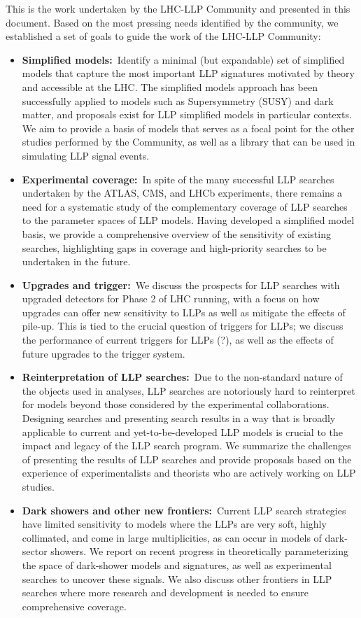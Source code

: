 This is the work undertaken by the LHC-LLP Community and presented in this document. Based on the most pressing needs identified by the community, we established a set of goals to guide the work of the LHC-LLP Community:
%
\begin{itemize}

\item {\bf Simplified models:}~Identify a minimal (but expandable) set of simplified models that capture the most important LLP signatures motivated by theory and accessible at the LHC. The simplified models approach has been successfully applied to models such as Supersymmetry (SUSY) and dark matter, and proposals exist for LLP simplified models in particular contexts. We aim to provide a basis of models that serves as a focal point for the other studies performed by the Community, as well as a library that can be used in simulating LLP signal events.

\item {\bf Experimental coverage:}~In spite of the many successful LLP searches undertaken by the ATLAS, CMS, and LHCb experiments, there remains a need for a systematic study of the complementary coverage of LLP searches to the parameter spaces of LLP models. Having developed a simplified model basis, we provide a comprehensive overview of the sensitivity of existing searches, highlighting gaps in coverage and high-priority searches to be undertaken in the future.

\item {\bf Upgrades and trigger:}~We discuss the prospects for LLP searches with upgraded detectors for Phase 2 of LHC running, with a focus on how upgrades can offer new sensitivity to LLPs as well as mitigate the effects of pile-up. This is tied to the crucial question of triggers for LLPs; we discuss the performance of current triggers for LLPs (?), as well as the effects of future upgrades to the trigger system.

\item {\bf Reinterpretation of LLP searches:}~Due to the non-standard nature of the objects used in analyses, LLP searches are notoriously hard to reinterpret for models beyond those considered by the experimental collaborations. Designing searches and presenting search results in a way that is broadly applicable to current and yet-to-be-developed LLP models is crucial to the impact and legacy of the LLP search program. We summarize the challenges of presenting the results of LLP searches and provide proposals based on the experience of experimentalists and theorists who are actively working on LLP studies.

\item {\bf Dark showers and other new frontiers:}~Current LLP search strategies have limited sensitivity to models where the LLPs are very soft, highly collimated, and come in large multiplicities, as can occur in models of dark-sector showers. We report on recent progress in theoretically parameterizing the space of dark-shower models and signatures, as well as experimental searches to uncover these signals. We also discuss other frontiers in LLP searches where more research and development is needed to ensure comprehensive coverage.

\end{itemize}
